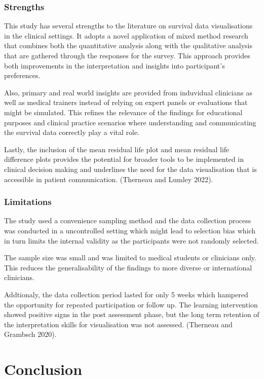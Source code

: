 \documentclass{article}
\begin{document}
\subsubsection{Strengths}\label{strengths}

This study has several strengths to the literature on survival data visualisations in the clinical settings. It adopts a novel application of mixed method research that combines both the quantitative analysis along with the qualitative analysis that are gathered through the responses for the survey. This approach provides both improvements in the interpretation and insights into participant's preferences.

Also, primary and real world insights are provided from induvidual clinicians as well as medical trainers instead of relying on expert panels or evaluations that might be simulated. This refines the relevance of the findings for educational purposes and clinical practice scenarios where understanding and communicating the survival data correctly play a vital role.

Lastly, the inclusion of the mean residual life plot and mean residual life difference plots provides the potential for broader tools to be implemented in clinical decision making and underlines the need for the data visualisation that is accessible in patient communication. (Therneau and Lumley 2022).

\subsubsection{Limitations}\label{limitations}

The study used a convenience sampling method and the data collection process was conducted in a uncontrolled setting which might lead to selection bias which in turn limits the internal validity as the participants were not randomly selected.

The sample size was small and was limited to medical students or clinicians only. This reduces the generalisability of the findings to more diverse or international clinicians.

Addtionaly, the data collection period lasted for only 5 weeks which
hampered the opportunity for repeated participation or follow up. The learning intervention showed positive signs in the post assessment phase, but the long term retention of the interpretation skills for visualisation was not assessed. (Therneau and Grambsch 2020).

\section{Conclusion}\label{conclusion}
\end{document}

